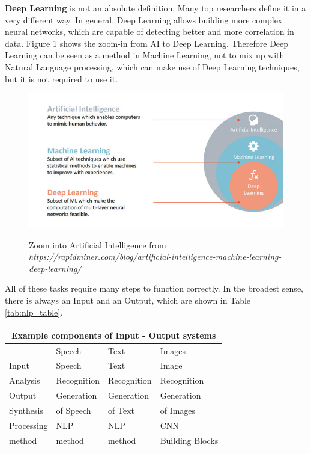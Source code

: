 \textbf{Deep Learning} is not an absolute definition. Many top researchers define it in a very different way. In general, Deep Learning allows building more complex neural networks, which are capable of detecting better and more correlation in data. Figure \ref{ai} shows the zoom-in from AI to Deep Learning. Therefore Deep Learning can be seen as a method in Machine Learning, not to mix up with Natural Language processing, which can make use of Deep Learning techniques, but it is not required to use it.

\begin{figure}
	\begin{center}
		\includegraphics[width=5.5in]{photos/ai_ml_dl.jpg}\\
		\caption{Zoom into Artificial Intelligence from \textit{https://rapidminer.com/blog/artificial-intelligence-machine-learning-deep-learning/}}\label{ai}
	\end{center}
\end{figure}

All of these tasks require many steps to function correctly. In the broadest sense, there is always an Input and an Output, which are shown in Table \ref{tab:nlp_table}.

\begin{center} 
	\begin{tabular}{ |p{3cm}||p{3cm}|p{3cm}|p{3cm}|}
		\hline
		\multicolumn{4}{|c|}{\textbf{Example components of Input - Output systems}}\\ \hline\hline
		&Speech &Text &Images \\ \hline
		Input &Speech &Text &Image \\
		Analysis &Recognition  &Recognition     &Recognition \\ \hline \hline
		Output &Generation &\cellcolor[HTML]{F3E687}Generation &Generation \\
		Synthesis &of Speech & \cellcolor[HTML]{F3E687}of Text &of Images \\ \hline \hline
		Processing &NLP &\cellcolor[HTML]{7ebfd3}NLP &CNN \\
		method &method  &\cellcolor[HTML]{7ebfd3}method     &Building Blocks \\ \hline
	\end{tabular}
	\label{tab:nlp_table}
\end{center}

